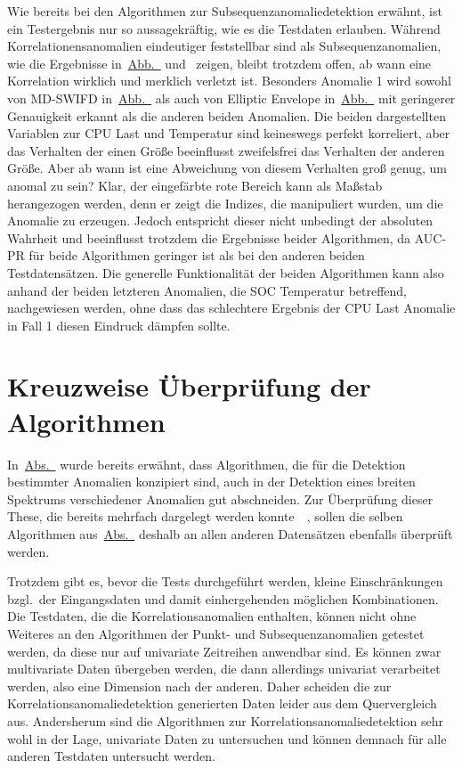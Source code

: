 Wie bereits bei den Algorithmen zur Subsequenzanomaliedetektion erwähnt, ist ein Testergebnis nur so aussagekräftig, wie es die Testdaten erlauben. Während
Korrelationensanomalien eindeutiger feststellbar sind als Subsequenzanomalien, wie die Ergebnisse in~\hyperref[fig:MDSWIFD_AUC_PR]{Abb.~}
und~ zeigen, bleibt trotzdem offen, ab wann eine Korrelation wirklich
und merklich verletzt ist. Besonders Anomalie 1 wird sowohl von MD-SWIFD in~\hyperref[fig:MDSWIFD_AUC_PR]{Abb.~} als auch von Elliptic
Envelope in~\hyperref[fig:EE_AUC_PR]{Abb.~} mit geringerer Genauigkeit erkannt als die anderen beiden Anomalien. Die beiden dargestellten
Variablen zur CPU Last und Temperatur sind keineswegs perfekt korreliert, aber das Verhalten der einen Größe beeinflusst zweifelsfrei das Verhalten der anderen
Größe. Aber ab wann ist eine Abweichung von diesem Verhalten groß genug, um anomal zu sein? Klar, der eingefärbte rote Bereich kann als Maßstab herangezogen werden, denn er
zeigt die Indizes, die manipuliert wurden, um die Anomalie zu erzeugen. Jedoch entspricht dieser nicht unbedingt der absoluten Wahrheit und beeinflusst trotzdem
die Ergebnisse beider Algorithmen, da AUC-PR für beide Algorithmen geringer ist als bei den anderen beiden Testdatensätzen. Die generelle Funktionalität der beiden
Algorithmen kann also anhand der beiden letzteren Anomalien, die SOC Temperatur betreffend, nachgewiesen werden, ohne dass das schlechtere Ergebnis der CPU Last Anomalie
in Fall 1 diesen Eindruck dämpfen sollte.

\clearpage
\section{Kreuzweise Überprüfung der Algorithmen}
In~\hyperref[sec:anomaliearten]{Abs.~} wurde bereits erwähnt, dass Algorithmen, die für die Detektion bestimmter Anomalien konzipiert
sind, auch in der Detektion eines breiten Spektrums verschiedener Anomalien gut abschneiden. Zur Überprüfung dieser These, die bereits mehrfach dargelegt
werden konnte~\cite[S.~30~-~31]{Wenig2024}~\cite{Schmidl2022}, sollen die selben Algorithmen aus~\hyperref[sec:algorithmen]{Abs.~} deshalb
an allen anderen Datensätzen ebenfalls überprüft werden.

Trotzdem gibt es, bevor die Tests durchgeführt werden, kleine Einschränkungen bzgl.~der Eingangsdaten und damit einhergehenden möglichen Kombinationen. Die
Testdaten, die die Korrelationsanomalien enthalten, können nicht ohne Weiteres an den Algorithmen der Punkt- und Subsequenzanomalien getestet werden, da
diese nur auf univariate Zeitreihen anwendbar sind. Es können zwar multivariate Daten übergeben werden, die dann allerdings univariat verarbeitet werden, also eine
Dimension nach der anderen. Daher scheiden die zur Korrelationsanomaliedetektion generierten Daten leider aus dem Quervergleich aus. Andersherum sind die Algorithmen
zur Korrelationsanomaliedetektion sehr wohl in der Lage, univariate Daten zu untersuchen und können demnach für alle anderen Testdaten untersucht werden.

